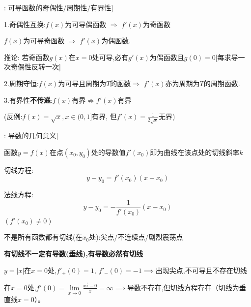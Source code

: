 \documentclass[11pt,a4paper,UTF8]{ctexart}
\begin{document}
\begin{thmbox}[原理[4]: 可导函数的奇偶性/周期性/有界性]

1.奇偶性互换:$f(x)$为可导偶函数     $\Rightarrow$ $f'(x)$为奇函数

	   $f(x)$为可导奇函数      $\Rightarrow$ $f'(x)$为偶函数.

  推论: 若奇函数$g(x)$在$x=0$处可导,必有$g'(x)$为偶函数且$g(0)=0$[每求导一次奇偶性反转一次]

2.周期守恒:$f(x)$为可导且周期为$T$的函数$\Rightarrow$ $f'(x)$亦为周期为$T$的周期函数.

3.有界性\textbf{不传递}:$f(x)$有界$\not\Rightarrow f'(x)$有界

  (反例:$f(x)=\sqrt{x}, x \in (0,1]$有界, 但$f'(x)=\frac{1}{2\sqrt{x}}$无界)

\end{thmbox}
\begin{thmbox}[原理[5]: 导数的几何意义]

函数$y = f(x)$在点$(x_0, y_0)$处的导数值$f'(x_0)$即为曲线在该点处的切线斜率$k$

  切线方程:
\begin{equation*}
y - y_0 = f'(x_0)(x - x_0)
\end{equation*}


  法线方程:
\begin{equation*}
y - y_0 = -\frac{1}{f'(x_0)}(x - x_0)
\end{equation*}
$(f'(x_0) \ne 0)$

\textit{}不是所有函数都有切线(在$x_0$处):尖点/不连续点/剧烈震荡点\textit{}

\textbf{有切线不一定有导数(垂线),有导数必然有切线}

  $y = |x|$在$x=0$处,$f'_+(0) = 1,\ f'_-(0) = -1 \implies$出现尖点,不可导且不存在切线 

  在$x=0$处,$f'(0) = \lim\limits_{x \to 0} \frac{x^{\frac{1}{3}} - 0}{x} = \infty \implies$导数不存在,但切线方程存在（切线为垂直线$x = 0$）。 

\end{thmbox}
\end{document}

